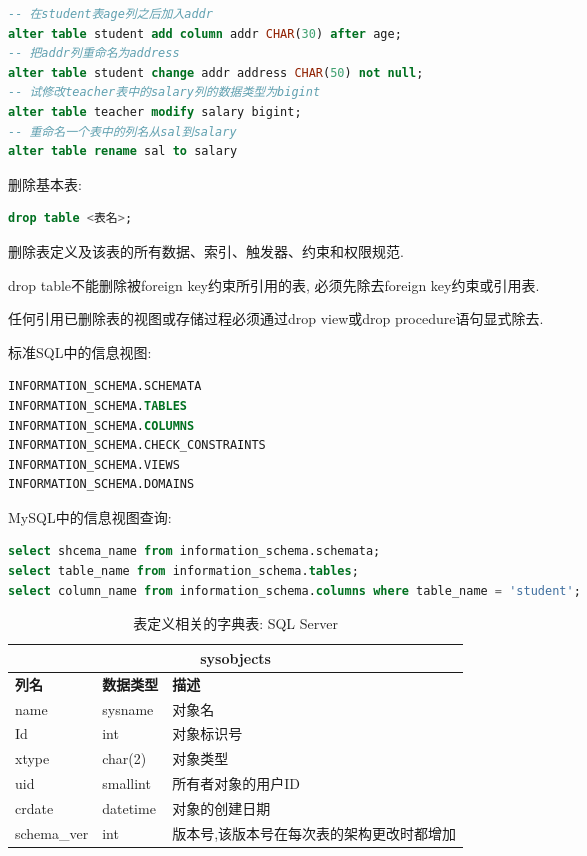 \begin{lstlisting}[language=SQL]
-- 在student表age列之后加入addr
alter table student add column addr CHAR(30) after age;
-- 把addr列重命名为address
alter table student change addr address CHAR(50) not null;
-- 试修改teacher表中的salary列的数据类型为bigint
alter table teacher modify salary bigint;
-- 重命名一个表中的列名从sal到salary
alter table rename sal to salary
\end{lstlisting}

删除基本表:
\begin{lstlisting}[language=SQL]
drop table <表名>;
\end{lstlisting}
删除表定义及该表的所有数据、索引、触发器、约束和权限规范.

drop table不能删除被foreign key约束所引用的表, 必须先除去foreign key约束或引用表.

任何引用已删除表的视图或存储过程必须通过drop view或drop procedure语句显式除去.

标准SQL中的信息视图:
\begin{lstlisting}[language=SQL]
INFORMATION_SCHEMA.SCHEMATA
INFORMATION_SCHEMA.TABLES
INFORMATION_SCHEMA.COLUMNS
INFORMATION_SCHEMA.CHECK_CONSTRAINTS
INFORMATION_SCHEMA.VIEWS
INFORMATION_SCHEMA.DOMAINS
\end{lstlisting}

MySQL中的信息视图查询:
\begin{lstlisting}[language=SQL]
select shcema_name from information_schema.schemata;
select table_name from information_schema.tables;
select column_name from information_schema.columns where table_name = 'student';
\end{lstlisting}

\begin{table}[H]
\centering
\label{tab:sysobjects}
\begin{tabular}{|l|l|l|}
\hline
\multicolumn{3}{|c|}{sysobjects} \\ \hline
\textbf{列名} & \textbf{数据类型} & \textbf{描述} \\ \hline
name & sysname & 对象名 \\ \hline
Id & int & 对象标识号 \\ \hline
xtype & char(2) & 对象类型 \\ \hline
uid & smallint & 所有者对象的用户ID \\ \hline
crdate & datetime & 对象的创建日期 \\ \hline
schema\_ver & int & 版本号,该版本号在每次表的架构更改时都增加 \\ \hline
\end{tabular}
\caption{表定义相关的字典表: SQL Server}
\end{table}

